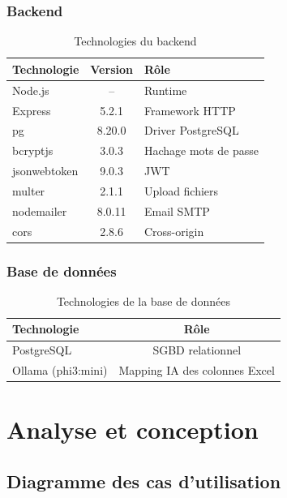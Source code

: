 \documentclass[12pt,a4paper]{report}
\begin{document}
\subsection*{Backend}
\begin{table}[H]
\centering
\caption{Technologies du backend}
\label{tab:backend-tech}
\begin{tabularx}{\textwidth}{lcl}
\toprule
\textbf{Technologie} & \textbf{Version} & \textbf{Rôle} \\
\midrule
Node.js & -- & Runtime \\
Express & 5.2.1 & Framework HTTP \\
pg & 8.20.0 & Driver PostgreSQL \\
bcryptjs & 3.0.3 & Hachage mots de passe \\
jsonwebtoken & 9.0.3 & JWT \\
multer & 2.1.1 & Upload fichiers \\
nodemailer & 8.0.11 & Email SMTP \\
cors & 2.8.6 & Cross-origin \\
\bottomrule
\end{tabularx}
\end{table}

\subsection*{Base de données}
\begin{table}[H]
\centering
\caption{Technologies de la base de données}
\label{tab:db-tech}
\begin{tabularx}{\textwidth}{lc}
\toprule
\textbf{Technologie} & \textbf{Rôle} \\
\midrule
PostgreSQL & SGBD relationnel \\
Ollama (phi3:mini) & Mapping IA des colonnes Excel \\
\bottomrule
\end{tabularx}
\end{table}

\chapter{Analyse et conception}

\section{Diagramme des cas d'utilisation}
\end{document}
